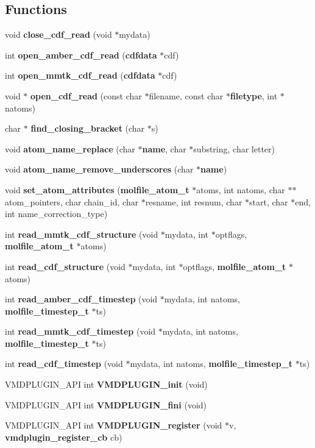 \subsection*{Functions}
\begin{CompactItemize}
\item 
void {\bf close\_\-cdf\_\-read} (void $\ast$mydata)
\item 
int {\bf open\_\-amber\_\-cdf\_\-read} ({\bf cdfdata} $\ast$cdf)
\item 
int {\bf open\_\-mmtk\_\-cdf\_\-read} ({\bf cdfdata} $\ast$cdf)
\item 
void $\ast$ {\bf open\_\-cdf\_\-read} (const char $\ast$filename, const char $\ast${\bf filetype}, int $\ast$natoms)
\item 
char $\ast$ {\bf find\_\-closing\_\-bracket} (char $\ast$s)
\item 
void {\bf atom\_\-name\_\-replace} (char $\ast${\bf name}, char $\ast$substring, char letter)
\item 
void {\bf atom\_\-name\_\-remove\_\-underscores} (char $\ast${\bf name})
\item 
void {\bf set\_\-atom\_\-attributes} ({\bf molfile\_\-atom\_\-t} $\ast$atoms, int natoms, char $\ast$$\ast$atom\_\-pointers, char chain\_\-id, char $\ast$resname, int resnum, char $\ast$start, char $\ast$end, int name\_\-correction\_\-type)
\item 
int {\bf read\_\-mmtk\_\-cdf\_\-structure} (void $\ast$mydata, int $\ast$optflags, {\bf molfile\_\-atom\_\-t} $\ast$atoms)
\item 
int {\bf read\_\-cdf\_\-structure} (void $\ast$mydata, int $\ast$optflags, {\bf molfile\_\-atom\_\-t} $\ast$atoms)
\item 
int {\bf read\_\-amber\_\-cdf\_\-timestep} (void $\ast$mydata, int natoms, {\bf molfile\_\-timestep\_\-t} $\ast$ts)
\item 
int {\bf read\_\-mmtk\_\-cdf\_\-timestep} (void $\ast$mydata, int natoms, {\bf molfile\_\-timestep\_\-t} $\ast$ts)
\item 
int {\bf read\_\-cdf\_\-timestep} (void $\ast$mydata, int natoms, {\bf molfile\_\-timestep\_\-t} $\ast$ts)
\item 
VMDPLUGIN\_\-API int {\bf VMDPLUGIN\_\-init} (void)
\item 
VMDPLUGIN\_\-API int {\bf VMDPLUGIN\_\-fini} (void)
\item 
VMDPLUGIN\_\-API int {\bf VMDPLUGIN\_\-register} (void $\ast$v, {\bf vmdplugin\_\-register\_\-cb} cb)
\end{CompactItemize}
